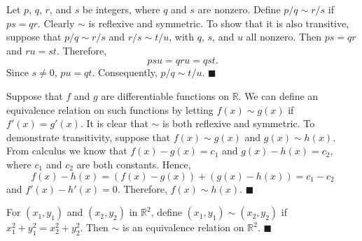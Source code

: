 Let $p$, $q$, $r$, and $s$ be integers, where $q$ and $s$ are nonzero.  Define $p/q \sim r/s$ if $ps = qr$.  Clearly $\sim$ is reflexive and symmetric.  To show that it is also transitive, suppose that $p/q \sim r/s$ and $r/s \sim t/u$, with $q$, $s$, and $u$ all nonzero.  Then $ps = qr$ and $ru = st$. Therefore, 
$$
psu = qru = qst.
$$
Since $s \neq 0$, $pu = qt$. Consequently, $p/q \sim t/u$.
\hspace{\fill} $\blacksquare$

\medskip

Suppose that $f$ and $g$ are differentiable functions on ${\mathbb R}$.  We can define an equivalence relation on such functions by letting $f(x) \sim g(x)$ if $f'(x) = g'(x)$. It is clear that $\sim$ is both reflexive and symmetric.  To demonstrate transitivity, suppose that $f(x) \sim g(x)$ and  $g(x) \sim h(x)$.  From calculus we know that $f(x) - g(x) = c_1$ and $g(x)- h(x) = c_2$, where $c_1$ and $c_2$ are both constants. Hence, 
$$
f(x) - h(x) = ( f(x) - g(x)) + ( g(x)- h(x))  = c_1 - c_2
$$
and $f'(x) - h'(x) =0$. Therefore, $f(x) \sim h(x)$.
\hspace{\fill} $\blacksquare$

\medskip

For $(x_1, y_1 )$ and $(x_2, y_2)$ in ${\mathbb R}^2$, define $(x_1, y_1 ) \sim (x_2, y_2)$ if $x_1^2 + y_1^2 = x_2^2 + y_2^2$.  Then $\sim$ is an equivalence relation on ${\mathbb R}^2$.
\hspace{\fill} $\blacksquare$

\medskip

